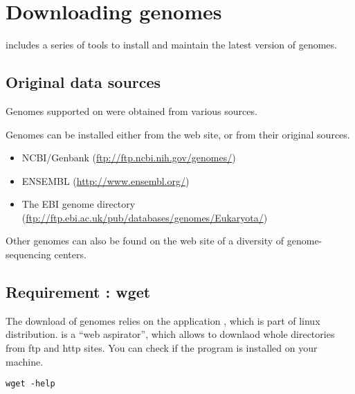
\section{Downloading genomes}
\label{downloading_genomes}

\RSAT includes a series of tools to install and maintain the latest
version of genomes.

\subsection{Original data sources}

Genomes supported on \RSAT were obtained from various sources.

Genomes can be installed either from the \RSAT web site, or from their
original sources.  

\begin{itemize}
\item NCBI/Genbank (\url{ftp://ftp.ncbi.nih.gov/genomes/})

\item ENSEMBL (\url{http://www.ensembl.org/})

\item The EBI genome directory (\url{ftp://ftp.ebi.ac.uk/pub/databases/genomes/Eukaryota/})

\end{itemize}

Other genomes can also be found on the web site of a diversity of
genome-sequencing centers.

\subsection{Requirement : wget}

The download of genomes relies on the application ,
which is part of linux distribution.  is a ``web
aspirator'', which allows to downlaod whole directories from ftp and
http sites. You can check if the program is installed on your machine.

\begin{footnotesize}
\begin{verbatim}
wget -help
\end{verbatim}
\end{footnotesize}


